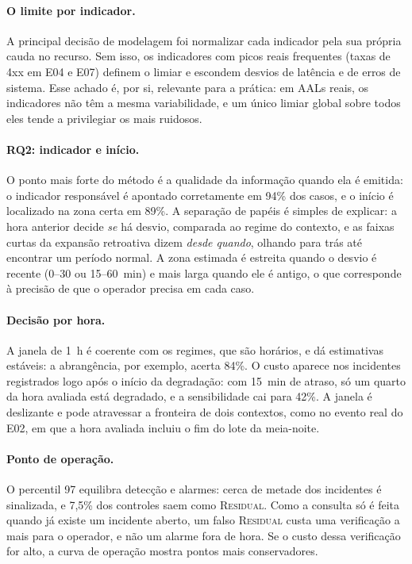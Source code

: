 \documentclass[sigconf,nonacm]{acmart}
\newcommand{\Residual}{\textsc{Residual}\xspace}
\begin{document}
\paragraph{O limite por indicador.} A principal decisão de modelagem foi normalizar cada indicador pela sua própria cauda no recurso. Sem isso, os indicadores com picos reais frequentes (taxas de 4xx em E04 e E07) definem o limiar e escondem desvios de latência e de erros de sistema. Esse achado é, por si, relevante para a prática: em AALs reais, os indicadores não têm a mesma variabilidade, e um único limiar global sobre todos eles tende a privilegiar os mais ruidosos.

\paragraph{RQ2: indicador e início.} O ponto mais forte do método é a qualidade da informação quando ela é emitida: o indicador responsável é apontado corretamente em 94\% dos casos, e o início é localizado na zona certa em 89\%. A separação de papéis é simples de explicar: a hora anterior decide \emph{se} há desvio, comparada ao regime do contexto, e as faixas curtas da expansão retroativa dizem \emph{desde quando}, olhando para trás até encontrar um período normal. A zona estimada é estreita quando o desvio é recente (0--30 ou 15--60~min) e mais larga quando ele é antigo, o que corresponde à precisão de que o operador precisa em cada caso.

\paragraph{Decisão por hora.} A janela de 1~h é coerente com os regimes, que são horários, e dá estimativas estáveis: a abrangência, por exemplo, acerta 84\%. O custo aparece nos incidentes registrados logo após o início da degradação: com 15~min de atraso, só um quarto da hora avaliada está degradado, e a sensibilidade cai para 42\%. A janela é deslizante e pode atravessar a fronteira de dois contextos, como no evento real do E02, em que a hora avaliada incluiu o fim do lote da meia-noite.

\paragraph{Ponto de operação.} O percentil 97 equilibra detecção e alarmes: cerca de metade dos incidentes é sinalizada, e 7,5\% dos controles saem como \Residual. Como a consulta só é feita quando já existe um incidente aberto, um falso \Residual custa uma verificação a mais para o operador, e não um alarme fora de hora. Se o custo dessa verificação for alto, a curva de operação mostra pontos mais conservadores.
\end{document}
